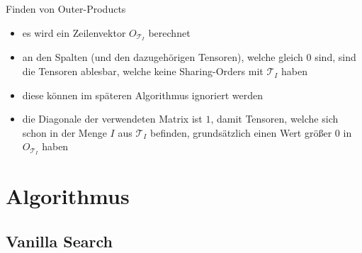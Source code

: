 \documentclass{beamer}
\newcommand{\Tau}{\bm{\mathcal{T}}}
\begin{document}
\begin{frame}{Finden von Outer-Products}
	\begin{itemize}
		\item es wird ein Zeilenvektor $O_{\Tau_I}$ berechnet
		\item an den Spalten (und den dazugehörigen Tensoren), welche gleich $0$ sind, sind die Tensoren ablesbar, welche keine Sharing-Orders mit $\Tau_I$ haben
		\item diese können im späteren Algorithmus ignoriert werden \pause
		\item die Diagonale der verwendeten Matrix ist $1$, damit Tensoren, welche sich schon in der Menge $I$ aus $\Tau_I$ befinden, grundsätzlich einen Wert größer $0$ in $O_{\Tau_I}$ haben
	\end{itemize}
\end{frame}



\section{Algorithmus}



\subsection{Vanilla Search}
\end{document}

